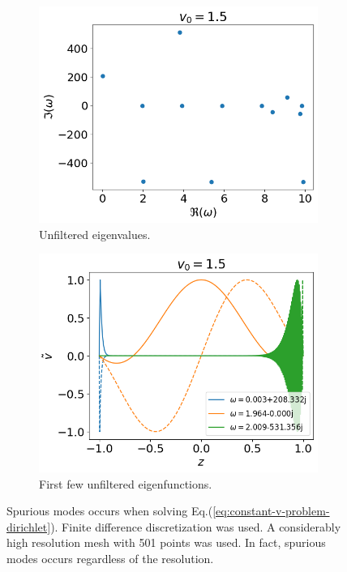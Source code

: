 \begin{figure}[htbp]	
  \centering
	\begin{subfigure}[b]{0.5\linewidth}
		\includegraphics[width=\linewidth]{figures/eigvals-bad} 
		\caption{Unfiltered eigenvalues.}
	\end{subfigure}%
	\begin{subfigure}[b]{0.5\linewidth}
		\includegraphics[width=\linewidth]{figures/eigvecs-bad} 
		\caption{First few unfiltered eigenfunctions.}
	\end{subfigure}
  \caption{Spurious modes occurs when solving Eq.(\ref{eq:constant-v-problem-dirichlet}). Finite difference discretization was used. A considerably high resolution mesh with 501 points was used. In fact, spurious modes occurs regardless of the resolution.}
	\label{fig:results-bad}
\end{figure}

